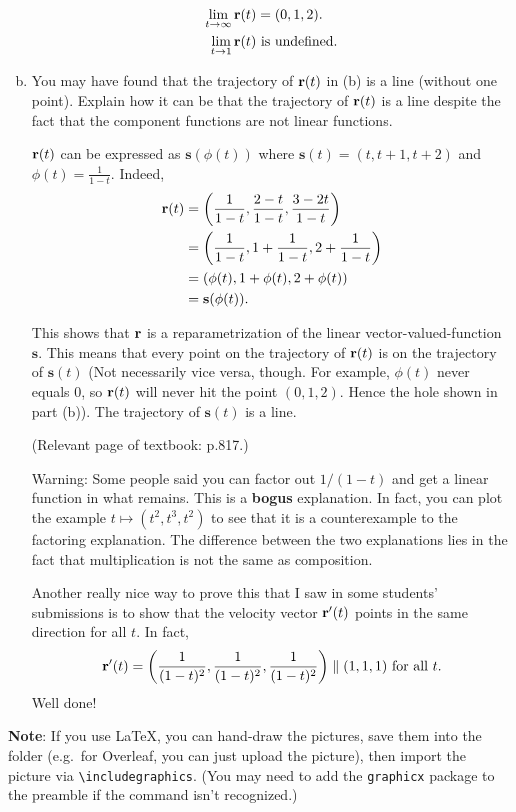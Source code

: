 \begin{problem}
\begin{enumerate}[(a)]
    \begin{solution}
      \begin{align*}
        \lim_{t\to\infty}\mathbf r(t) &= (0,1,2). \\
        \lim_{t\to 1}\mathbf r(t) &\text{ is undefined}.
      \end{align*}
    \end{solution}
    \item You may have found that the trajectory of $\mathbf r(t)$ in (b) is a line (without one point). Explain how it can be that the trajectory of $\mathbf r(t)$ is a line despite the fact that the component functions are not linear functions.
    \begin{solution}
      $\mathbf r(t)$ can be expressed as $\mathbf s(\phi(t))$ where $\mathbf s(t)=(t,t+1,t+2)$ and $\phi(t)=\frac{1}{1-t}$. Indeed,
      \[\begin{split}
        \mathbf r(t)&=\left(\frac 1{1-t},\frac{2-t}{1-t},\frac{3-2t}{1-t}\right)\\
        &= \left(\frac{1}{1-t},1+\frac{1}{1-t},2+\frac{1}{1-t}\right)\\
        &= (\phi(t),1+\phi(t),2+\phi(t))\\
        &= \mathbf s(\phi(t)).
      \end{split}\]

      This shows that $\mathbf r$ is a reparametrization of the linear vector-valued-function $\mathbf s$. This means that every point on the trajectory of $\mathbf r(t)$ is on the trajectory of $\mathbf s(t)$ (Not necessarily vice versa, though. For example, $\phi(t)$ never equals 0, so $\mathbf r(t)$ will never hit the point $(0,1,2)$. Hence the hole shown in part (b)). The trajectory of $\mathbf s(t)$ is a line.

      (Relevant page of textbook: p.817.)

      Warning: Some people said you can factor out $1/(1-t)$ and get a linear function in what remains. This is a \textbf{bogus} explanation. In fact, you can plot the example $t\mapsto (t^2,t^3,t^2)$ to see that it is a counterexample to the factoring explanation. The difference between the two explanations lies in the fact that multiplication is not the same as composition.

      Another really nice way to prove this that I saw in some students' submissions is to show that the velocity vector $\mathbf r'(t)$ points in the same direction for all $t$. In fact,
      \[\mathbf r'(t)=\left(\frac{1}{(1-t)^2},\frac{1}{(1-t)^2},\frac{1}{(1-t)^2}\right)\parallel(1,1,1)\text{ for all }t.\]
      Well done!
    \end{solution}
  \end{enumerate}
  \textbf{Note}: If you use \LaTeX, you can hand-draw the pictures, save them into the folder (e.g.\ for Overleaf, you can just upload the picture), then import the picture via \verb|\includegraphics|. (You may need to add the \texttt{graphicx} package to the preamble if the command isn't recognized.)
\end{problem}


